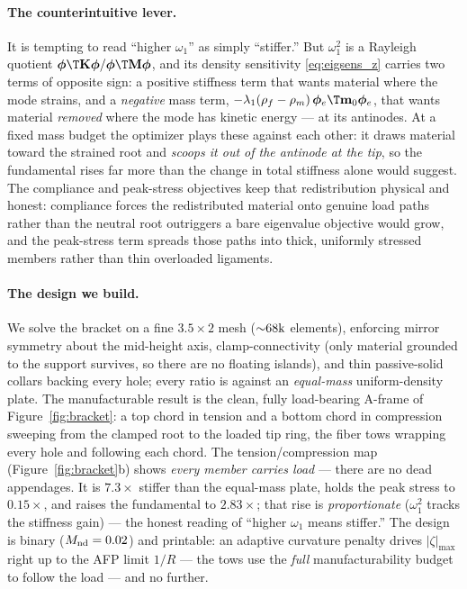 \documentclass[11pt]{article}
\begin{document}
\paragraph{The counterintuitive lever.} It is tempting to read ``higher $\omega_1$''
as simply ``stiffer.'' But $\omega_1^2$ is a Rayleigh quotient
$\bm\phi\T\mathbf K\bm\phi/\bm\phi\T\mathbf M\bm\phi$, and its density sensitivity
\eqref{eq:eigsens_z} carries two terms of opposite sign: a positive stiffness term
that wants material where the mode strains, and a \emph{negative} mass term,
$-\lambda_1(\rho_f-\rho_m)\,\bm\phi_e\T\mathbf m_0\bm\phi_e$, that wants material
\emph{removed} where the mode has kinetic energy --- at its antinodes. At a fixed mass
budget the optimizer plays these against each other: it draws material toward the
strained root and \emph{scoops it out of the antinode at the tip}, so the fundamental
rises far more than the change in total stiffness alone would suggest. The compliance
and peak-stress objectives keep that redistribution physical and honest: compliance
forces the redistributed material onto genuine load paths rather than the neutral root
outriggers a bare eigenvalue objective would grow, and the peak-stress term spreads
those paths into thick, uniformly stressed members rather than thin overloaded
ligaments.

\paragraph{The design we build.} We solve the bracket on a fine $3.5\times2$ mesh
(${\sim}68\rm k$ elements), enforcing mirror symmetry about the mid-height axis,
clamp-connectivity (only material grounded to the support survives, so there are no
floating islands), and thin passive-solid collars backing every hole; every ratio is
against an \emph{equal-mass} uniform-density plate. The manufacturable result is the
clean, fully load-bearing A-frame of Figure~\ref{fig:bracket}: a top chord in tension and
a bottom chord in compression sweeping from the clamped root to the loaded tip ring, the
fiber tows wrapping every hole and following each chord. The tension/compression map
(Figure~\ref{fig:bracket}b) shows \emph{every member carries load} --- there are no dead
appendages. It is $7.3\times$ stiffer than the equal-mass plate, holds the peak stress to
$0.15\times$, and raises the fundamental to $2.83\times$; that rise is \emph{proportionate}
($\omega_1^2$ tracks the stiffness gain) --- the honest reading of ``higher $\omega_1$
means stiffer.'' The design is binary ($M_{\rm nd}=0.02$) and printable: an adaptive
curvature penalty drives $|\zeta|_{\max}$ right up to the AFP limit $1/R$ --- the tows use
the \emph{full} manufacturability budget to follow the load --- and no further.
\end{document}

